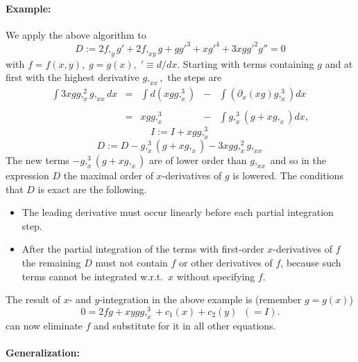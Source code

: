 \paragraph*{Example:}

We apply the above algorithm to
\begin{equation*}
  D := 2f,_yg' + 2f,_{xy}g + gg'^3 + xg'^4 + 3xgg'^2g'' = 0
\end{equation*}
with $f = f(x,y), \; g = g(x), \; '\equiv d/dx$.  Starting with terms
containing $g$ and at first with the highest derivative $g,_{xx},$ the
steps are
\[ \begin{array}{rcccl}
  \int 3xgg,_x^2g,_{xx} dx
  & = & \int d(xgg,_x^3)
  & - & \int \left( \partial_x(xg) g,_x^3\right) dx \\ \\
  & = & xgg,_x^3 & - & \int g,_x^3(g + xg,_x) dx,
\end{array} \]
\[ I := I + xgg,_x^3 \]
\[ D := D - g,_x^3(g + xg,_x) - 3xgg,_x^2g,_{xx} \]
The new terms $- g,_x^3(g + xg,_x)$ are of lower order than $g,_{xx}$
and so in the expression $D$ the maximal order of $x$-derivatives of
$g$ is lowered.  The conditions that $D$ is exact are the following.
\begin{itemize}
\item The leading derivative must occur linearly before each partial
  integration step.
\item After the partial integration of the terms with first-order
  $x$-derivatives of $f$ the remaining $D$ must not contain $f$ or
  other derivatives of $f$, because such terms cannot be integrated
  w.r.t.\ $x$ without specifying $f$.
\end{itemize}
The result of $x$- and $y$-integration in the above example is
(remember $g=g(x)$)
\[ 0 = 2fg + xygg,_x^3 + c_1(x) + c_2(y) \; \; (=I). \]
 can now eliminate $f$ and substitute
for it in all other equations.

\paragraph*{Generalization:}


